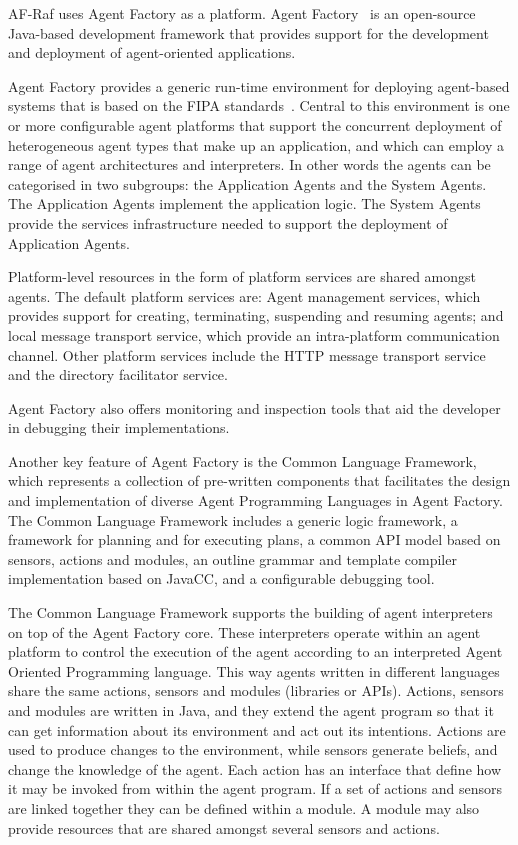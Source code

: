 \documentclass[a4paper,12pt,oneside,fleqn]{book} %
\begin{document}
AF-Raf uses Agent Factory as a platform. Agent
Factory~\cite{collier2002agent} is an open-source Java-based development
framework that provides support for the development and deployment of
agent-oriented applications.

Agent Factory provides a generic run-time environment for deploying
agent-based systems that is based on the FIPA
standards~\cite{poslad2000fipa}.  Central to this environment is one or
more configurable agent platforms that support the concurrent deployment of
heterogeneous agent types that make up an application, and which can employ
a range of agent architectures and interpreters. In other words the agents
can be categorised in two subgroups: the Application Agents and the System
Agents. The Application Agents implement the application logic. The System
Agents provide the services infrastructure needed to support the deployment
of Application Agents.

Platform-level resources in the form of platform services are shared
amongst agents. The default platform services are: Agent management
services, which provides support for creating, terminating, suspending and
resuming agents; and local message transport service, which provide an
intra-platform communication channel. Other platform services include the
HTTP message transport service and the directory facilitator service.

Agent Factory also offers monitoring and inspection tools that aid the
developer in debugging their implementations.

Another key feature of Agent Factory is the Common Language Framework,
which represents a collection of pre-written components that facilitates
the design and implementation of diverse Agent Programming Languages in
Agent Factory\null. The Common Language Framework includes a generic logic
framework, a framework for planning and for executing plans, a common API
model based on sensors, actions and modules, an outline grammar and
template compiler implementation based on JavaCC, and a configurable
debugging tool.

The Common Language Framework supports the building of agent interpreters
on top of the Agent Factory core. These interpreters operate within an
agent platform to control the execution of the agent according to an
interpreted Agent Oriented Programming language. This way agents written in
different languages share the same actions, sensors and modules (libraries
or APIs). Actions, sensors and modules are written in Java, and they extend
the agent program so that it can get information about its environment and
act out its intentions. Actions are used to produce changes to the
environment, while sensors generate beliefs, and change the knowledge of
the agent. Each action has an interface that define how it may be invoked
from within the agent program. If a set of actions and sensors are linked
together they can be defined within a module. A module may also provide
resources that are shared amongst several sensors and actions.
\end{document}
